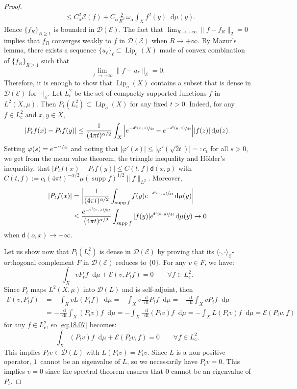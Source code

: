 \documentclass[JEP,XML,SOM,Unicode,published]{cedram}
\newcommand{\rmc}{\mathrm{c}}
\theoremstyle{plain}
\theoremstyle{definition}
\newcommand{\cE}{\mathcal{E}}
\newcommand{\cD}{\mathcal{D}}
\let\phi\varphi
\newcommand{\di}{\mathop{}\!\mathrm{d}}
\DeclareMathOperator{\supp}{supp}
\DeclareMathOperator{\Lip}{Lip}
\newcommand{\dist}{\mathsf{d}}
\begin{document}
\begin{proof}
\begin{align*}
&\le C_\alpha^2 \cE(f)+C_\alpha \frac{2}{R^2}\, \omega_\alpha \int_X f^2(y)\di\mu(y).
\end{align*}
Hence $\{f_R\}_{R\ge 1}$ is bounded in $\cD(\cE)$. The fact that $\lim_{R\to +\infty} \|f-f_R\|_2=0$ implies that $f_R$ converges weakly to $f$ in $\cD(\cE)$ when $R\to+\infty$. By Mazur's lemma, there exists a sequence $\{u_\ell\}_\ell \subset \Lip_\rmc(X)$ made of convex combination of $\{f_R\}_{R\ge 1}$ such that
\[
\lim_{\ell\to +\infty} \|f-u_\ell\|_\cE=0.
\]
Therefore, it is enough to show that $\Lip_o(X)$ contains a subset that is dense in $\cD(\cE)$ for $|\cdot|_\cE$. Let $L^2_\rmc$ be the set of compactly supported functions $f$ in $L^2(X,\mu)$. Then $P_t(L^2_\rmc) \subset \Lip_o(X)$ for any fixed $t>0$. Indeed, for any $f \in L^2_\rmc$ and $x, y \in X$,
\[
|P_tf(x) - P_tf(y)|\le \frac{1}{(4\pi t)^{\alpha/2}} \int_X \Big|e^{-\sfrac{\dist^2(x,z)}{4t}}-e^{-\sfrac{\dist^2(y,z)}{4t}}\Big| |f(z)| \di \mu(z).
\]
Setting $\phi(s)=e^{-\sfrac{s^2}{4t}}$ and noting that $|\phi'(s)|\le |\phi'(\sqrt{2t})|=:c_t$ for all $s>0$, we get from the mean value theorem, the triangle inequality and Hölder's inequality, that $|P_tf(x) - P_tf(y)|\le C(t,f) \dist(x,y)$ with $C(t,f):=c_t(4 \pi t)^{-\alpha/2} \mu(\supp f)^{1/2} \| f \|_{L^2}$. Moreover,
\begin{align*}
|P_tf(x)| &= \left|\frac{1}{(4\pi t)^{\alpha/2}} \int_{\supp f} f(y) e^{-\sfrac{\dist^2(x,y)}{4t}} \di \mu(y)\right|\\
&\le \frac{ e^{-\sfrac{\dist^2(o,x)}{8t}} }{ (4\pi t)^{\alpha/2} } \int_{\supp f} |f(y)| e^{\sfrac{\dist^2(o,y)}{4t}} \di \mu(y) \to 0
\end{align*}
when $\dist(o,x) \to +\infty$.

Let us show now that $P_t(L^2_\rmc)$ is dense in $\cD(\cE)$ by proving that its $\langle \cdot, \cdot \rangle_{\cE}$-orthogonal complement $F$ in $\cD(\cE)$ reduces to $\{0\}$. For any $v\in F$, we have:
\begin{equation}\label{eq:18.07}
\int_X v P_t f \di \mu + \cE(v,P_t f)=0 \qquad \forall f \in L^2_\rmc.
\end{equation}
Since $P_t$ maps $L^2(X,\mu)$ into $\cD(L)$ and is self-adjoint, then
\begin{align*}
\cE(v,P_t f) & = - \int_X v L (P_t f) \di \mu = -\int_X v \frac{\di}{\di t} P_t f \di \mu = -\frac{\di}{\di t} \int_X v P_t f \di \mu\\
& = - \frac{\di}{\di t} \int_X (P_tv) f \di \mu
= -\int_X \frac{\di}{\di t}(P_tv) f \di \mu = - \int_X L(P_tv) f \di \mu = \cE(P_tv,f)
\end{align*}
for any $f \in L^2_\rmc$, so \eqref{eq:18.07} becomes:
\[
\int_X (P_tv) f \di \mu + \cE(P_t v,f)=0 \qquad \forall f \in L^2_\rmc.
\]
This implies $P_t v \in \cD(L)$ with $L (P_t v) = P_t v$. Since $L$ is a non-positive operator, $1$~cannot be an eigenvalue of $L$, so we necessarily have $P_t v = 0$. This implies $v=0$ since the spectral theorem ensures that $0$ cannot be an eigenvalue of $P_t$.
\end{proof}
\end{document}

